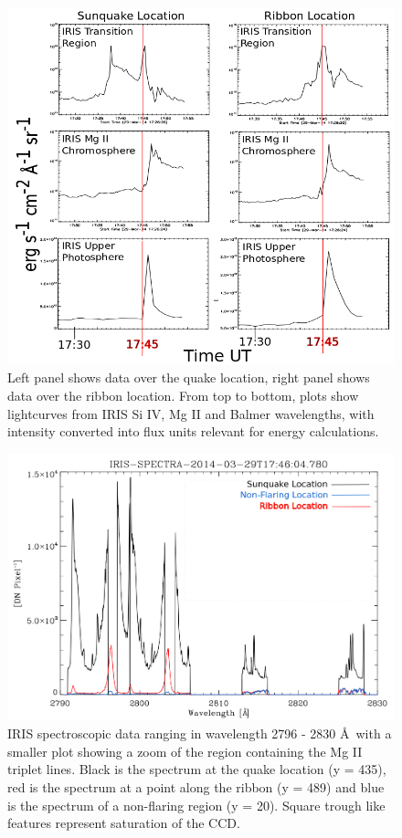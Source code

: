 \begin{figure}%
  \begin{center}
  \includegraphics[width=1.0\textwidth]{lcfluxseries}
  \end{center}
  \caption{Left panel shows data over the quake location, right panel shows data over the ribbon location. From top to bottom, plots show lightcurves from IRIS Si IV, Mg II and Balmer wavelengths, with intensity converted into flux units relevant for energy calculations.}\label{lcfluxseries}
\end{figure}

\begin{figure}%
  \begin{center}
  \includegraphics[width=1.0\textwidth]{spectra}
  \end{center}
  \caption{IRIS spectroscopic data ranging in wavelength 2796 - 2830 \AA\ with a smaller plot showing a zoom of the region containing the Mg II triplet lines. Black is the spectrum at the quake location (y = 435), red is the spectrum at a point along the ribbon (y = 489) and blue is the spectrum of a non-flaring region (y = 20). Square trough like features represent saturation of the CCD.}
\end{figure}\label{spectra}
 


